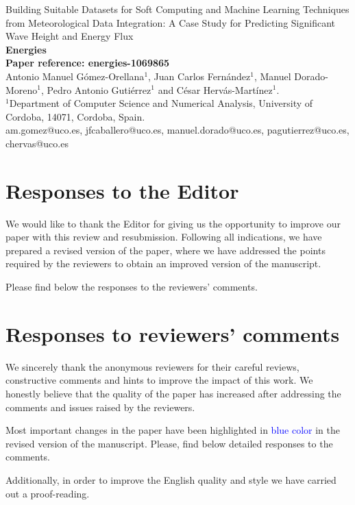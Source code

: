 \documentclass[a4paper,twoside,11pt]{article}
\makeatletter
\newcommand{\myAuthors}{Antonio Manuel Gómez-Orellana$^1$, Juan Carlos Fernández$^1$, Manuel Dorado-Moreno$^1$, Pedro Antonio Gutiérrez$^1$ and César Hervás-Martínez$^1$.}
\newcommand{\myEmail}{\Letter \quad  am.gomez@uco.es, jfcaballero@uco.es, manuel.dorado@uco.es, pagutierrez@uco.es, chervas@uco.es}
\newcommand{\myTitle}{Building Suitable Datasets for Soft Computing and Machine Learning Techniques from Meteorological Data Integration: A Case Study for Predicting Significant Wave Height and Energy Flux}
\newcommand{\myJournal}{\textbf{Energies}}
\newcommand{\myRefPaper}{\textbf{Paper reference: energies-1069865}}
\newcommand{\myDepartament}{$^1$Department of Computer Science and Numerical Analysis, University of Cordoba, 14071, Cordoba, Spain.}
\newcounter{comments}[section]
\makeatother
\begin{document}
\thispagestyle{plain}

\begin{center}
	{\LARGE\myTitle} \vspace{0.5cm} \\
	{\LARGE\myJournal} \vspace{0.5cm} \\
	{\Large\myRefPaper} \vspace{0.5cm} \\
	\myAuthors \vspace{0.5cm} \\
	{\myDepartament} \vspace{0.5cm} \\
	{\myEmail}
\end{center}

\tableofcontents

\section{Responses to the Editor}
We would like to thank the Editor for giving us the opportunity to improve our paper with this review and resubmission. Following all indications, we have prepared a revised version of the paper, where we have addressed the points required by the reviewers to obtain an improved version of the manuscript.


Please find below the responses to the reviewers' comments.

\section{Responses to reviewers' comments}
We sincerely thank the anonymous reviewers for their careful reviews, constructive comments and hints to improve the impact of this work. We honestly believe that the quality of the paper has increased after addressing the comments and issues raised by the reviewers. 

Most important changes in the paper have been highlighted in \textcolor{blue}{blue color} in the revised version of the manuscript. Please, find below detailed responses to the comments.

Additionally, in order to improve the English quality and style we have carried out a proof-reading.
\end{document}
